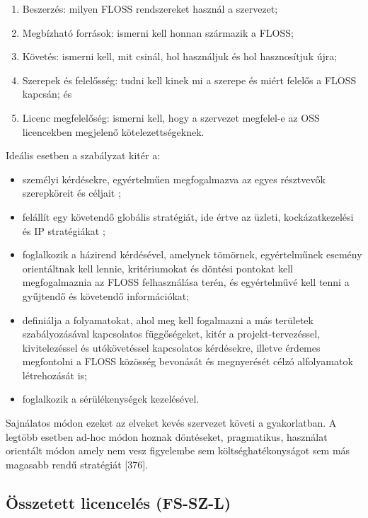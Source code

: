 \documentclass[12pt,magyar,a4paper,oneside]{scrreprt}
\providecommand{\tightlist}{%
  \setlength{\itemsep}{0pt}\setlength{\parskip}{0pt}}
\begin{document}
\begin{enumerate}
\def\labelenumi{\arabic{enumi}.}
\tightlist
\item
  Beszerzés: milyen FLOSS rendszereket használ a szervezet;
\item
  Megbízható források: ismerni kell honnan származik a FLOSS;
\item
  Követés: ismerni kell, mit csinál, hol használjuk és hol hasznosítjuk
  újra;
\item
  Szerepek és felelősség: tudni kell kinek mi a szerepe és miért felelős
  a FLOSS kapcsán; és
\item
  Licenc megfelelőség: ismerni kell, hogy a szervezet megfelel-e az OSS
  licencekben megjelenő kötelezettségeknek.
\end{enumerate}

Ideális esetben a szabályzat kitér a:

\begin{itemize}
\tightlist
\item
  személyi kérdésekre, egyértelműen megfogalmazva az egyes résztvevők
  szerepköreit és céljait ;
\item
  felállít egy követendő globális stratégiát, ide értve az üzleti,
  kockázatkezelési és IP stratégiákat ;
\item
  foglalkozik a házirend kérdésével, amelynek tömörnek, egyértelműnek
  esemény orientáltnak kell lennie, kritériumokat és döntési pontokat
  kell megfogalmaznia az FLOSS felhasználása terén, és egyértelművé kell
  tenni a gyűjtendő és követendő információkat;
\item
  definiálja a folyamatokat, ahol meg kell fogalmazni a más területek
  szabályozásával kapcsolatos függőségeket, kitér a projekt-tervezéssel,
  kivitelezéssel és utókövetéssel kapcsolatos kérdésekre, illetve
  érdemes megfontolni a FLOSS közösség bevonását és megnyerését célzó
  alfolyamatok létrehozását is;
\item
  foglalkozik a sérülékenységek kezelésével.
\end{itemize}

Sajnálatos módon ezeket az elveket kevés szervezet követi a
gyakorlatban. A legtöbb esetben ad-hoc módon hoznak döntéseket,
pragmatikus, használat orientált módon amely nem vesz figyelembe sem
költséghatékonyságot sem más magasabb rendű stratégiát {[}376{]}.

\hypertarget{sec:FS-SZ-L}{%
\subsection{Összetett licencelés (FS-SZ-L)}\label{sec:FS-SZ-L}}
\end{document}
